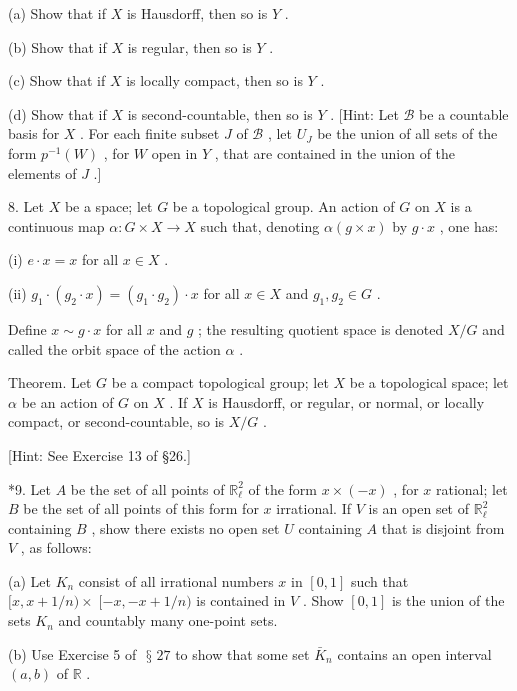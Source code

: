 \documentclass[10pt]{article}
\begin{document}
(a) Show that if \(X\) is Hausdorff, then so is \(Y\) .

(b) Show that if \(X\) is regular, then so is \(Y\) .

(c) Show that if \(X\) is locally compact, then so is \(Y\) .

(d) Show that if \(X\) is second-countable, then so is \(Y\) . [Hint: Let \(\mathcal{B}\) be a countable basis for \(X\) . For each finite subset \(J\) of \(\mathcal{B}\) , let \({U}_{J}\) be the union of all sets of the form \({p}^{-1}\left( W\right)\) , for \(W\) open in \(Y\) , that are contained in the union of the elements of \(J\) .]

8. Let \(X\) be a space; let \(G\) be a topological group. An action of \(G\) on \(X\) is a continuous map \(\alpha  : G \times  X \rightarrow  X\) such that, denoting \(\alpha \left( {g \times  x}\right)\) by \(g \cdot  x\) , one has:

(i) \(e \cdot  x = x\) for all \(x \in  X\) .

(ii) \({g}_{1} \cdot  \left( {{g}_{2} \cdot  x}\right)  = \left( {{g}_{1} \cdot  {g}_{2}}\right)  \cdot  x\) for all \(x \in  X\) and \({g}_{1},{g}_{2} \in  G\) .

Define \(x \sim  g \cdot  x\) for all \(x\) and \(g\) ; the resulting quotient space is denoted \(X/G\) and called the orbit space of the action \(\alpha\) .

Theorem. Let \(G\) be a compact topological group; let \(X\) be a topological space; let \(\alpha\) be an action of \(G\) on \(X\) . If \(X\) is Hausdorff, or regular, or normal, or locally compact, or second-countable, so is \(X/G\) .

[Hint: See Exercise 13 of §26.]

*9. Let \(A\) be the set of all points of \({\mathbb{R}}_{\ell }^{2}\) of the form \(x \times  \left( {-x}\right)\) , for \(x\) rational; let \(B\) be the set of all points of this form for \(x\) irrational. If \(V\) is an open set of \({\mathbb{R}}_{\ell }^{2}\) containing \(B\) , show there exists no open set \(U\) containing \(A\) that is disjoint from \(V\) , as follows:

(a) Let \({K}_{n}\) consist of all irrational numbers \(x\) in \(\left\lbrack  {0,1}\right\rbrack\) such that \(\lbrack x,x + 1/n) \times \; \lbrack  - x, - x + 1/n)\) is contained in \(V\) . Show \(\left\lbrack  {0,1}\right\rbrack\) is the union of the sets \({K}_{n}\) and countably many one-point sets.

(b) Use Exercise 5 of \(\text{ § }{27}\) to show that some set \({\bar{K}}_{n}\) contains an open interval \(\left( {a,b}\right)\) of \(\mathbb{R}\) .
\end{document}
